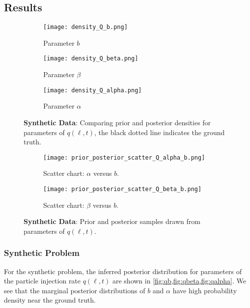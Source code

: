 \subsection{Results}\label{sec:diffResults}

\begin{figure*}[!htb]
  \centering
  \begin{subfigure}[b]{0.5\textwidth}
    \centering
    \texttt{[image: density\_Q\_b.png]}
    \caption{ {\small Parameter $b$}}
    \label{fig:qb}
  \end{subfigure}
  \hfill
  \begin{subfigure}[b]{0.5\textwidth}
    \centering
    \texttt{[image: density\_Q\_beta.png]}
    \caption{{\small Parameter $\beta$}}
    \label{fig:qbeta}
  \end{subfigure}
  \hfill
  \begin{subfigure}[b]{0.5\textwidth}
    \centering
    \texttt{[image: density\_Q\_alpha.png]}
    \caption{{\small Parameter $\alpha$}}
    \label{fig:qalpha}
  \end{subfigure}
  \caption{\textbf{Synthetic Data}: Comparing prior and posterior densities for 
  parameters of $q(\ell, t)$, the black dotted line indicates the ground truth.}  
\end{figure*}

\begin{figure*}[!htb]
  \centering
  \begin{subfigure}[b]{0.75\textwidth}
    \centering
    \texttt{[image: prior\_posterior\_scatter\_Q\_alpha\_b.png]}
    \caption{{\small Scatter chart: $\alpha$ versus $b$.}}
    \label{fig:alphavsb}
  \end{subfigure}
  \hfill
  \begin{subfigure}[b]{0.75\textwidth}
    \centering
    \texttt{[image: prior\_posterior\_scatter\_Q\_beta\_b.png]}
    \caption{{\small Scatter chart: $\beta$ versus $b$.}}
    \label{fig:betavsb}
  \end{subfigure}
  \caption{\textbf{Synthetic Data}: Prior and posterior samples drawn 
  from parameters of $q(\ell, t)$.}
\end{figure*}

\subsubsection*{Synthetic Problem}

For the synthetic problem, the inferred posterior distribution for parameters of the particle 
injection rate $q(\ell, t)$ are shown in \cref{fig:qb,fig:qbeta,fig:qalpha}. We see that the 
marginal posterior distributions of $b$ and $\alpha$ have high probability density near the ground 
truth. 

